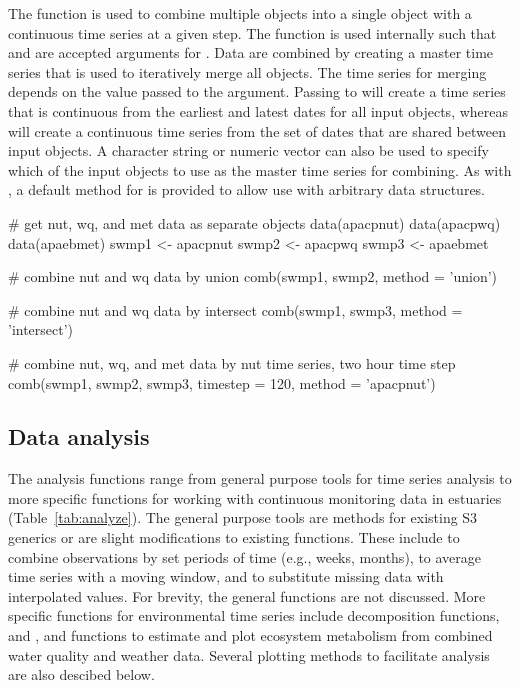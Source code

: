 The  function is used to combine multiple  objects into a single object with a continuous time series at a given step.  The  function is used internally such that  and  are accepted arguments for .  Data are combined by creating a master time series that is used to iteratively merge all  objects.  The time series for merging depends on the value passed to the  argument.  Passing  to  will create a time series that is continuous from the earliest and latest dates for all input objects, whereas  will create a continuous time series from the set of dates that are shared between input objects.  A character string or numeric vector can also be used to specify which of the input objects to use as the master time series for combining.  As with , a default method for  is provided to allow use with arbitrary data structures.  

\begin{example}
# get nut, wq, and met data as separate objects
data(apacpnut)
data(apacpwq)
data(apaebmet)
swmp1 <- apacpnut
swmp2 <- apacpwq
swmp3 <- apaebmet

# combine nut and wq data by union
comb(swmp1, swmp2, method = 'union')

# combine nut and wq data by intersect
comb(swmp1, swmp3, method = 'intersect')

# combine nut, wq, and met data by nut time series, two hour time step
comb(swmp1, swmp2, swmp3, timestep = 120, method = 'apacpnut')
\end{example}

\subsection{Data analysis}

The analysis functions range from general purpose tools for time series analysis to more specific functions for working with continuous monitoring data in estuaries (Table~\ref{tab:analyze}).  The general purpose tools are  methods for existing S3 generics or are slight modifications to existing functions. These include  to combine observations by set periods of time (e.g., weeks, months),  to average time series with a moving window, and  to substitute missing data with interpolated values.  For brevity, the general functions are not discussed.  More specific functions for environmental time series include decomposition functions,  and , and functions to estimate and plot ecosystem metabolism from combined water quality and weather data.  Several plotting methods to facilitate analysis are also descibed below.  

